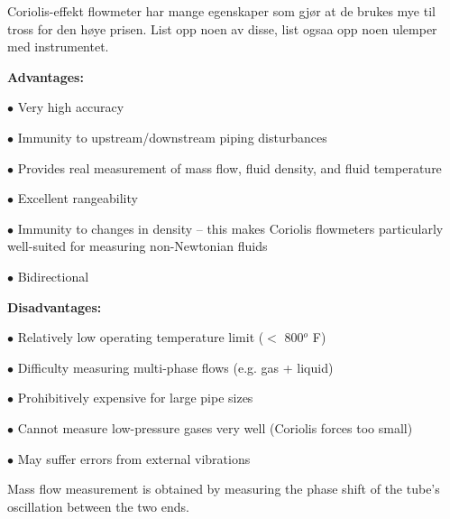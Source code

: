 


Coriolis-effekt flowmeter har mange egenskaper som gj{\o}r at de brukes mye til tross for den h{\o}ye prisen. List opp noen av disse, list ogs{aa} opp noen ulemper med instrumentet.







{\bf Advantages:}

\medskip
\item{$\bullet$} Very high accuracy
\item{$\bullet$} Immunity to upstream/downstream piping disturbances
\item{$\bullet$} Provides real measurement of mass flow, fluid density, and fluid temperature
\item{$\bullet$} Excellent rangeability
\item{$\bullet$} Immunity to changes in density -- this makes Coriolis flowmeters particularly well-suited for measuring non-Newtonian fluids
\item{$\bullet$} Bidirectional
\medskip

\vskip 10pt

{\bf Disadvantages:}

\medskip
\item{$\bullet$} Relatively low operating temperature limit ($<$ 800$^{o}$ F)
\item{$\bullet$} Difficulty measuring multi-phase flows (e.g. gas + liquid)
\item{$\bullet$} Prohibitively expensive for large pipe sizes
\item{$\bullet$} Cannot measure low-pressure gases very well (Coriolis forces too small)
\item{$\bullet$} May suffer errors from external vibrations
\medskip

\vskip 10pt

Mass flow measurement is obtained by measuring the phase shift of the tube's oscillation between the two ends.  

